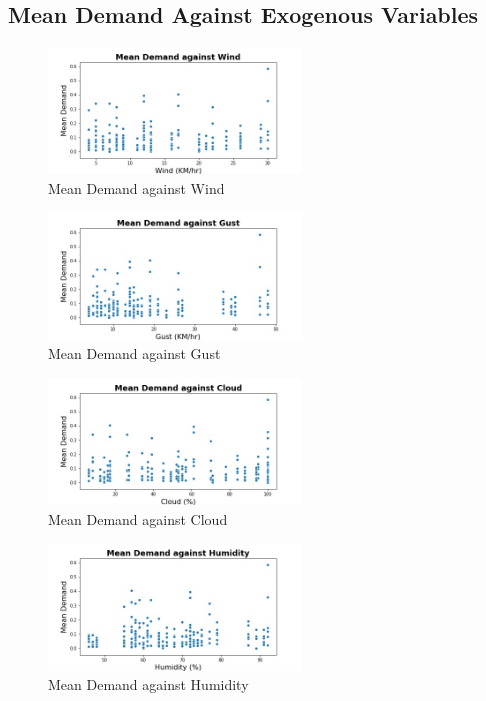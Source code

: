 \documentclass[12pt, letterpaper] {article}
\begin{document}
\subsection{Mean Demand Against Exogenous Variables}

\begin{figure}[H]
    \centering
    \includegraphics[width=0.6\textwidth, height=0.3\textheight]{Images/wind_mean_demand.jpg}
    \caption{Mean Demand against Wind}
    \label{fig:Mean Demand against Wind}
\end{figure}

\begin{figure}[H]
    \centering
    \includegraphics[width=0.6\textwidth, height=0.3\textheight]{Images/gust_mean_demand.jpg}
    \caption{Mean Demand against Gust}
    \label{fig:Mean Demand against Gust}
\end{figure}

\begin{figure}[H]
    \centering
    \includegraphics[width=0.6\textwidth, height=0.3\textheight]{Images/cloud_mean_demand.jpg}
    \caption{Mean Demand against Cloud}
    \label{fig:Mean Demand against Cloud}
\end{figure}

\begin{figure}[H]
    \centering
    \includegraphics[width=0.6\textwidth, height=0.3\textheight]{Images/humidity_mean_demand.jpg}
    \caption{Mean Demand against Humidity}
    \label{fig:Mean Demand against Humidity}
\end{figure}
\end{document}
